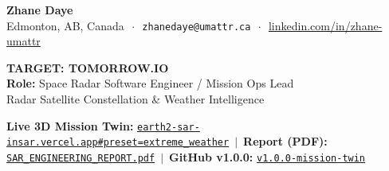 \documentclass[10pt,letterpaper]{article}
\begin{document}
\begin{tcolorbox}[colframe=tomorrowblue,colback=tomorrowblue,coltext=white,boxrule=0pt,top=6pt,bottom=6pt]
\begin{minipage}[c]{0.58\textwidth}
    {\Large\textbf{Zhane Daye}} \\[2pt]
    {\footnotesize Edmonton, AB, Canada $\,\cdot\,$ \texttt{zhanedaye@umattr.ca} $\,\cdot\,$ \href{https://www.linkedin.com/in/zhane-umattr}{linkedin.com/in/zhane-umattr}}
\end{minipage}
\hfill
\begin{minipage}[c]{0.40\textwidth}
    \raggedleft
    {\large\textbf{TARGET: TOMORROW.IO}}\\[1pt]
    {\footnotesize\textbf{Role:} Space Radar Software Engineer / Mission Ops Lead}\\[1pt]
    {\scriptsize Radar Satellite Constellation \& Weather Intelligence}
\end{minipage}
\end{tcolorbox}

\vspace{-4pt}

\begin{tcolorbox}[colframe=bordergray,colback=lightbg,top=3pt,bottom=3pt]
\footnotesize
\textbf{Live 3D Mission Twin:} \href{https://earth2-sar-insar.vercel.app#preset=extreme_weather&stage=v3}{\texttt{earth2-sar-insar.vercel.app\#preset=extreme\_weather}} $\,\vert\,$ 
\textbf{Report (PDF):} \href{https://earth2-sar-insar.vercel.app/reports/EARTH2_X_BAND_SAR_INSAR_ENGINEERING_REPORT.pdf}{\texttt{SAR\_ENGINEERING\_REPORT.pdf}} $\,\vert\,$ 
\textbf{GitHub v1.0.0:} \href{https://github.com/zrt219/earth2studio/releases/tag/v1.0.0-mission-twin}{\texttt{v1.0.0-mission-twin}}
\end{tcolorbox}

\vspace{-4pt}
\end{document}
